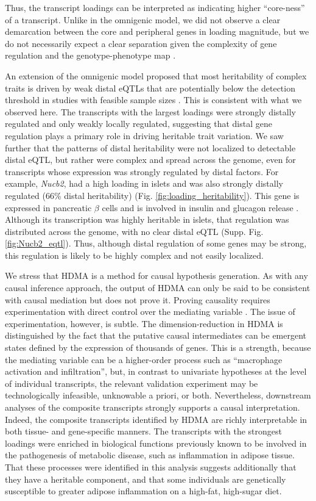 \documentclass[
]{article}
\begin{document}
Thus, the transcript loadings can be interpreted as indicating higher
``core-ness'' of a transcript. Unlike in the omnigenic model, we did not
observe a clear demarcation between the core and peripheral genes in
loading magnitude, but we do not necessarily expect a clear separation
given the complexity of gene regulation and the genotype-phenotype map
\cite{pmid29906445}.

An extension of the omnigenic model proposed that most heritability of
complex traits is driven by weak distal eQTLs that are potentially below
the detection threshold in studies with feasible sample sizes
\cite{pmid31051098}. This is consistent with what we observed here. The
transcripts with the largest loadings were strongly distally regulated
and only weakly locally regulated, suggesting that distal gene
regulation plays a primary role in driving heritable trait variation. We
saw further that the patterns of distal heritability were not localized
to detectable distal eQTL, but rather were complex and spread across the
genome, even for transcripts whose expression was strongly regulated by
distal factors. For example, \textit{Nucb2}, had a high loading in
islets and was also strongly distally regulated (66\% distal
heritability) (Fig. \ref{fig:loading_heritability}). This gene is
expressed in pancreatic \(\beta\) cells and is involved in insulin and
glucagon release \cite{pmid22108805, pmid23537085, pmid24993278}.
Although its transcription was highly heritable in islets, that
regulation was distributed across the genome, with no clear distal eQTL
(Supp. Fig. \ref{fig:Nucb2_eqtl}). Thus, although distal regulation of
some genes may be strong, this regulation is likely to be highly complex
and not easily localized.

We stress that HDMA is a method for causal hypothesis generation. As
with any causal inference approach, the output of HDMA can only be said
to be consistent with causal mediation but does not prove it. Proving
causality requires experimentation with direct control over the
mediating variable \cite{pearl2009causality}. The issue of
experimentation, however, is subtle. The dimension-reduction in HDMA is
distinguished by the fact that the putative causal intermediates can be
emergent states defined by the expression of thousands of genes. This is
a strength, because the mediating variable can be a higher-order process
such as ``macrophage activation and infiltration'', but, in contrast to
univariate hypotheses at the level of individual transcripts, the
relevant validation experiment may be technologically infeasible,
unknowable a priori, or both. Nevertheless, downstream analyses of the
composite transcripts strongly supports a causal interpretation. Indeed,
the composite transcripts identified by HDMA are richly interpretable in
both tissue- and gene-specific manners. The transcripts with the
strongest loadings were enriched in biological functions previously
known to be involved in the pathogenesis of metabolic disease, such as
inflammation in adipose tissue. That these processes were identified in
this analysis suggests additionally that they have a heritable
component, and that some individuals are genetically susceptible to
greater adipose inflammation on a high-fat, high-sugar diet.
\end{document}
